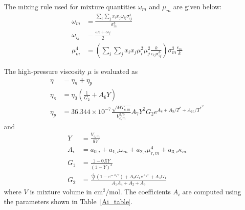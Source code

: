 The mixing rule used for mixture quantities $\omega_m$ and $\mu_m$ are given below:
\begin{align}
    \omega_m &= \frac{\sum_i\sum_j x_ix_j \omega_{ij}\sigma_{ij}^3}{\sigma_m^3}\\
    \omega_{ij} &= \frac{\omega_i+\omega_j}{2}\\
    \mu_m^4 &= \left(\sum_i\sum_j x_i x_j \mu_{i}^2 \mu_{j}^2  \frac{k}{\epsilon_{ij}\sigma_{ij}^3}\right) \sigma_m^3\frac{\epsilon_m}{k}
\end{align}

The high-pressure viscosity $\mu$ is evaluated as
\begin{align}
\eta &= \eta_{\kappa} +\eta_p \\
\eta_{\kappa} &= \eta_0 \left( \frac{1}{G_2}+A_6 Y \right) \\
\eta_p &= 36.344\times 10^{-7}\frac{\sqrt{M T_{c,m}}}{V_{c,m}^{2/3}}A_7Y^2G_2 e^{A_8+A_9/T^*+A_{10}/{T^*}^2}
\end{align}
and 
\begin{align}
    Y &= \frac{V_{c,m}}{6V} \\
    A_{i} &= a_{0,i} + a_{1,i}\omega_m + a_{2,i} \mu_{r,m}^4 + a_{3,i} \kappa_m\\
    G_1 &= \frac{1-0.5 Y }{(1-Y)^3} \\
    G_2 &=\frac{ \frac{A_1}{Y} \left(1- e^{-A_4 Y}\right)+ A_2 G_1 e^{A_5 Y}+A_3 G_1 }{A_1A_4+A_2+A_3} 
\end{align}
where $V$ is mixture volume in $\text{cm}^3/\text{mol}$. The coefficients $A_i$ are
computed using the parameters shown in Table~\ref{Ai_table}.



